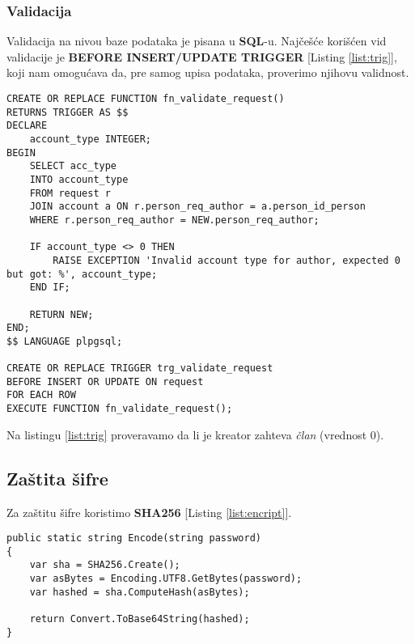 \subsubsection*{Validacija}
\par Validacija na nivou baze podataka je pisana u \textbf{SQL}-u. Najčešće korišćen
vid validacije je \textbf{BEFORE INSERT/UPDATE TRIGGER} [Listing \ref{list:trig}], koji nam omogućava da, pre samog upisa podataka, proverimo njihovu validnost.
\begin{lstlisting}[caption={Primer validacije pomoću trigera}, captionpos=b, label=list:trig]
CREATE OR REPLACE FUNCTION fn_validate_request()
RETURNS TRIGGER AS $$
DECLARE
	account_type INTEGER;
BEGIN
	SELECT acc_type
	INTO account_type
	FROM request r
	JOIN account a ON r.person_req_author = a.person_id_person
	WHERE r.person_req_author = NEW.person_req_author;

	IF account_type <> 0 THEN
		RAISE EXCEPTION 'Invalid account type for author, expected 0 but got: %', account_type;
	END IF;

	RETURN NEW;
END;
$$ LANGUAGE plpgsql;

CREATE OR REPLACE TRIGGER trg_validate_request
BEFORE INSERT OR UPDATE ON request
FOR EACH ROW
EXECUTE FUNCTION fn_validate_request();
\end{lstlisting}
\par Na listingu \ref{list:trig} proveravamo da li je kreator zahteva \textit{član} (vrednost 0).
\subsection{Zaštita šifre}
\par Za zaštitu šifre koristimo \textbf{SHA256} [Listing \ref{list:encript}]. 
\begin{lstlisting}[caption={Primer funkcije za zaštitu šifre}, captionpos=b, label=list:encript]
public static string Encode(string password)
{
    var sha = SHA256.Create();
    var asBytes = Encoding.UTF8.GetBytes(password);
    var hashed = sha.ComputeHash(asBytes);

    return Convert.ToBase64String(hashed);
}
\end{lstlisting}
